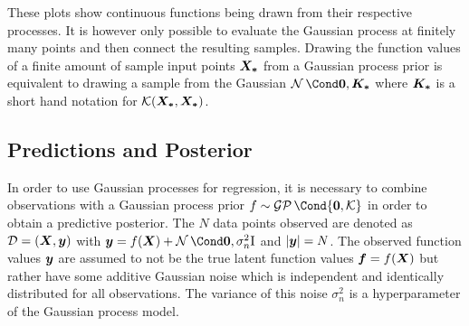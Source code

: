 These plots show continuous functions being drawn from their respective processes.
It is however only possible to evaluate the Gaussian process at finitely many points and then connect the resulting samples.
Drawing the function values of a finite amount of sample input points $\bm{X_\ast}$ from a Gaussian process prior is equivalent to drawing a sample from the Gaussian $\Gaussian{\mat{0}, \mat{K_\ast}}$ where $\bm{K_\ast}$ is a short hand notation for $\operatorname{\mathcal{K}}(\bm{X_\ast}, \bm{X_\ast})$.

\subsection{Predictions and Posterior}
In order to use Gaussian processes for regression, it is necessary to combine observations with a Gaussian process prior $f \sim \GP\Cond{\mat{0}, \K}$ in order to obtain a predictive posterior.
The $N$ data points observed are denoted as $\mathcal{D} = \left( \bm{X}, \bm{y} \right)$ with $\mat{y} = f(\mat{X}) + \Gaussian{\mat{0}, \sigma_n^2 \Eye}$ and $\vert\bm{y}\vert = N$.
The observed function values $\bm{y}$ are assumed to not be the true latent function values $\bm{f} = f(\bm{X})$ but rather have some additive Gaussian noise which is independent and identically distributed for all observations.
The variance of this noise $\sigma_n^2$ is a hyperparameter of the Gaussian process model.

